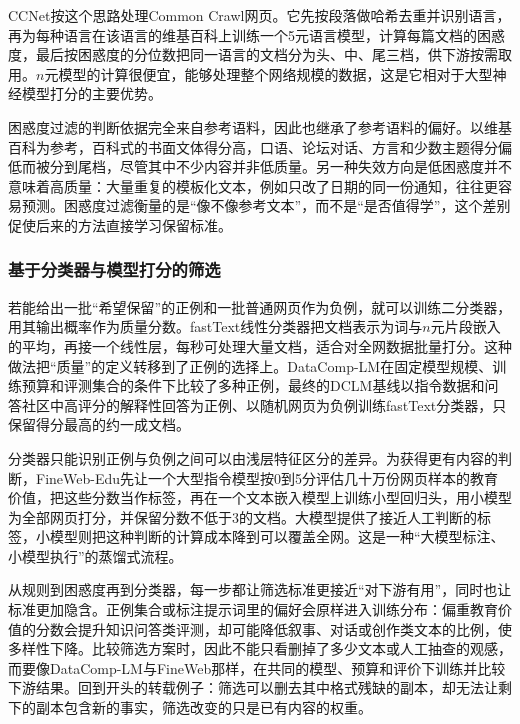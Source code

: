 CCNet按这个思路处理Common Crawl网页。它先按段落做哈希去重并识别语言，再为每种语言在该语言的维基百科上训练一个5元语言模型，计算每篇文档的困惑度，最后按困惑度的分位数把同一语言的文档分为头、中、尾三档，供下游按需取用。$n$元模型的计算很便宜，能够处理整个网络规模的数据，这是它相对于大型神经模型打分的主要优势。

困惑度过滤的判断依据完全来自参考语料，因此也继承了参考语料的偏好。以维基百科为参考，百科式的书面文体得分高，口语、论坛对话、方言和少数主题得分偏低而被分到尾档，尽管其中不少内容并非低质量。另一种失效方向是低困惑度并不意味着高质量：大量重复的模板化文本，例如只改了日期的同一份通知，往往更容易预测。困惑度过滤衡量的是“像不像参考文本”，而不是“是否值得学”，这个差别促使后来的方法直接学习保留标准。

\subsubsection{基于分类器与模型打分的筛选}
\label{sec:nlp-llm-data-classifier-filter}

若能给出一批“希望保留”的正例和一批普通网页作为负例，就可以训练二分类器，用其输出概率作为质量分数。fastText线性分类器把文档表示为词与$n$元片段嵌入的平均，再接一个线性层，每秒可处理大量文档，适合对全网数据批量打分。这种做法把“质量”的定义转移到了正例的选择上。DataComp-LM在固定模型规模、训练预算和评测集合的条件下比较了多种正例，最终的DCLM基线以指令数据和问答社区中高评分的解释性回答为正例、以随机网页为负例训练fastText分类器，只保留得分最高的约一成文档。

分类器只能识别正例与负例之间可以由浅层特征区分的差异。为获得更有内容的判断，FineWeb-Edu先让一个大型指令模型按0到5分评估几十万份网页样本的教育价值，把这些分数当作标签，再在一个文本嵌入模型上训练小型回归头，用小模型为全部网页打分，并保留分数不低于3的文档。大模型提供了接近人工判断的标签，小模型则把这种判断的计算成本降到可以覆盖全网。这是一种“大模型标注、小模型执行”的蒸馏式流程。

从规则到困惑度再到分类器，每一步都让筛选标准更接近“对下游有用”，同时也让标准更加隐含。正例集合或标注提示词里的偏好会原样进入训练分布：偏重教育价值的分数会提升知识问答类评测，却可能降低叙事、对话或创作类文本的比例，使多样性下降。比较筛选方案时，因此不能只看删掉了多少文本或人工抽查的观感，而要像DataComp-LM与FineWeb那样，在共同的模型、预算和评价下训练并比较下游结果。回到开头的转载例子：筛选可以删去其中格式残缺的副本，却无法让剩下的副本包含新的事实，筛选改变的只是已有内容的权重。

